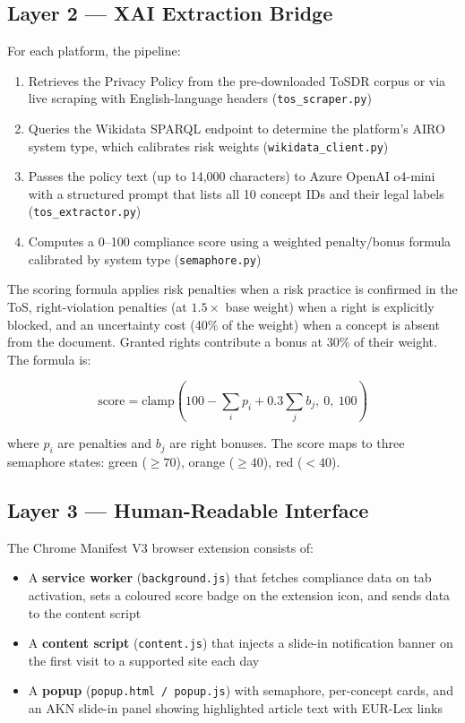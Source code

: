 \documentclass[12pt, a4paper]{article}
\begin{document}
\subsection{Layer 2 — XAI Extraction Bridge}

For each platform, the pipeline:

\begin{enumerate}[noitemsep]
  \item Retrieves the Privacy Policy from the pre-downloaded ToSDR corpus or via live scraping with English-language headers (\texttt{tos\_scraper.py})
  \item Queries the Wikidata SPARQL endpoint to determine the platform's AIRO system type, which calibrates risk weights (\texttt{wikidata\_client.py})
  \item Passes the policy text (up to 14,000 characters) to Azure OpenAI o4-mini with a structured prompt that lists all 10 concept IDs and their legal labels (\texttt{tos\_extractor.py})
  \item Computes a 0--100 compliance score using a weighted penalty/bonus formula calibrated by system type (\texttt{semaphore.py})
\end{enumerate}

The scoring formula applies risk penalties when a risk practice is confirmed in the ToS, right-violation penalties (at $1.5\times$ base weight) when a right is explicitly blocked, and an uncertainty cost (40\% of the weight) when a concept is absent from the document. Granted rights contribute a bonus at 30\% of their weight. The formula is:

\[
\text{score} = \text{clamp}\!\left(100 - \sum_i p_i + 0.3 \sum_j b_j,\ 0,\ 100\right)
\]

where $p_i$ are penalties and $b_j$ are right bonuses. The score maps to three semaphore states: green ($\geq 70$), orange ($\geq 40$), red ($< 40$).

\subsection{Layer 3 — Human-Readable Interface}

The Chrome Manifest V3 browser extension consists of:

\begin{itemize}[noitemsep]
  \item A \textbf{service worker} (\texttt{background.js}) that fetches compliance data on tab activation, sets a coloured score badge on the extension icon, and sends data to the content script
  \item A \textbf{content script} (\texttt{content.js}) that injects a slide-in notification banner on the first visit to a supported site each day
  \item A \textbf{popup} (\texttt{popup.html / popup.js}) with semaphore, per-concept cards, and an AKN slide-in panel showing highlighted article text with EUR-Lex links
\end{itemize}
\end{document}
